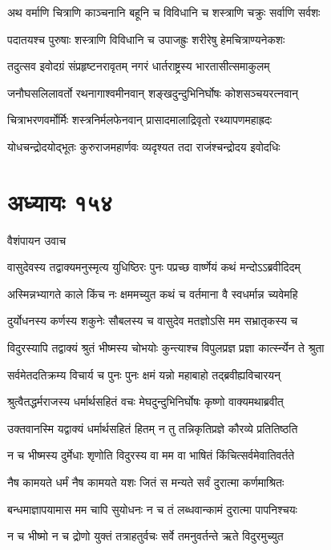 \twolineshloka
{अथ वर्माणि चित्राणि काञ्चनानि बहूनि च}
{विविधानि च शस्त्राणि चक्रुः सर्वाणि सर्वशः}


\twolineshloka
{पदातयश्च पुरुषाः शस्त्राणि विविधानि च}
{उपाजह्रुः शरीरेषु हेमचित्राण्यनेकशः}


\twolineshloka
{तदुत्सव इवोदग्रं संप्रहृष्टनरावृतम्}
{नगरं धार्तराष्ट्रस्य भारतासीत्समाकुलम्}


\twolineshloka
{जनौघसलिलावर्तो रथनागाश्वमीनवान्}
{शङ्खदुन्दुभिनिर्घोषः कोशसञ्चयरत्नवान्}


\twolineshloka
{चित्राभरणवर्मोर्मिः शस्त्रनिर्मलफेनवान्}
{प्रासादमालाद्रिवृतो रथ्यापणमहाह्रदः}


\twolineshloka
{योधचन्द्रोदयोद्भूतः कुरुराजमहार्णवः}
{व्यदृश्यत तदा राजंश्चन्द्रोदय इवोदधिः}


\chapter{अध्यायः १५४}
\twolineshloka
{वैशंपायन उवाच}
{}


\twolineshloka
{वासुदेवस्य तद्वाक्यमनुस्मृत्य युधिष्ठिरः}
{पुनः पप्रच्छ वार्ष्णेयं कथं मन्दोऽऽब्रवीदिदम्}


\twolineshloka
{अस्मिन्नभ्यागते काले किंच नः क्षममच्युत}
{कथं च वर्तमाना वै स्वधर्मान्न च्यवेमहि}


\twolineshloka
{दुर्योधनस्य कर्णस्य शकुनेः सौबलस्य च}
{वासुदेव मतज्ञोऽसि मम सभ्रातृकस्य च}


\twolineshloka
{विदुरस्यापि तद्वाक्यं श्रुतं भीष्मस्य चोभयोः}
{कुन्त्याश्च विपुलप्रज्ञ प्रज्ञा कार्त्स्न्येन ते श्रुता}


\twolineshloka
{सर्वमेतदतिक्रम्य विचार्य च पुनः पुनः}
{क्षमं यन्नो महाबाहो तद्ब्रवीह्यविचारयन्}


\twolineshloka
{श्रुत्वैतद्धर्मराजस्य धर्मार्थसहितं वचः}
{मेघदुन्दुभिनिर्घोषः कृष्णो वाक्यमथाब्रवीत्}


\twolineshloka
{उक्तवानस्मि यद्वाक्यं धर्मार्थसहितं हितम्}
{न तु तन्निकृतिप्रज्ञे कौरव्ये प्रतितिष्ठति}


\twolineshloka
{न च भीष्मस्य दुर्मेधाः शृणोति विदुरस्य वा}
{मम वा भाषितं किंचित्सर्वमेवातिवर्तते}


\twolineshloka
{नैष कामयते धर्मं नैष कामयते यशः}
{जितं स मन्यते सर्वं दुरात्मा कर्णमाश्रितः}


\twolineshloka
{बन्धमाज्ञापयामास मम चापि सुयोधनः}
{न च तं लब्धवान्कामं दुरात्मा पापनिश्चयः}


\twolineshloka
{न च भीष्मो न च द्रोणो युक्तं तत्राहतुर्वचः}
{सर्वे तमनुवर्तन्ते ऋते विदुरमुच्युत}


